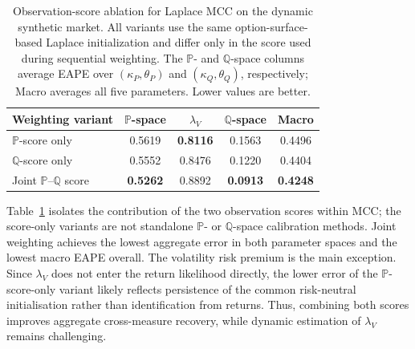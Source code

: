 \documentclass[sigconf,anonymous,review]{acmart}
\begin{document}
\begin{table}[!t]
\centering
\caption{Observation-score ablation for Laplace MCC on the dynamic synthetic market. All variants use the same option-surface-based Laplace initialization and differ only in the score used during sequential weighting. The $\mathbb{P}$- and $\mathbb{Q}$-space columns average EAPE over $(\kappa_P,\theta_P)$ and $(\kappa_Q,\theta_Q)$, respectively; Macro averages all five parameters. Lower values are better.}
\label{tab:score_ablation}
\begin{tabular}{|l|c|c|c|c|}
\hline
\textbf{Weighting variant}
& \textbf{$\mathbb{P}$-space}
& \textbf{$\lambda_V$}
& \textbf{$\mathbb{Q}$-space}
& \textbf{Macro} \\
\hline
$\mathbb{P}$-score only
& 0.5619
& \textbf{0.8116}
& 0.1563
& 0.4496 \\
\hline
$\mathbb{Q}$-score only
& 0.5552
& 0.8476
& 0.1220
& 0.4404 \\
\hline
Joint $\mathbb{P}$--$\mathbb{Q}$ score
& \textbf{0.5262}
& 0.8892
& \textbf{0.0913}
& \textbf{0.4248} \\
\hline
\end{tabular}
\vspace{-3pt}
\end{table}
Table~\ref{tab:score_ablation} isolates the contribution of the two observation scores within MCC; the score-only variants are not standalone $\mathbb{P}$- or $\mathbb{Q}$-space calibration methods. Joint weighting achieves the lowest aggregate error in both parameter spaces and the lowest macro EAPE overall. The volatility risk premium is the main exception. Since $\lambda_V$ does not enter the return
likelihood directly, the lower error of the $\mathbb{P}$-score-only variant likely reflects persistence of the common risk-neutral initialisation rather than identification from returns. Thus, combining both scores improves aggregate cross-measure recovery, while dynamic estimation of $\lambda_V$ remains challenging.



\end{document}
